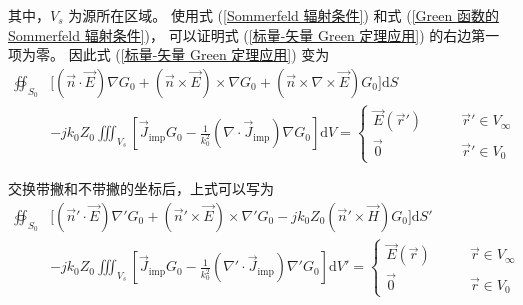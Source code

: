 \par 其中，$V_{s}$ 为源所在区域。
使用式 (\ref{Sommerfeld 辐射条件}) 和式 (\ref{Green 函数的 Sommerfeld 辐射条件})，
可以证明式 (\ref{标量-矢量 Green 定理应用}) 的右边第一项为零。
因此式 (\ref{标量-矢量 Green 定理应用}) 变为
\begin{equation}
    \begin{aligned}
        \oiint_{S_0} &\Big[
            (\vec{n}\cdot \vec{E})\nabla G_0
            +(\vec{n}\times \vec{E})\times\nabla G_0
            +(\vec{n}\times\nabla\times \vec{E})G_0
        \Big]\text{d}S\\
        &-jk_0Z_0\iiint_{V_{s}} \left[
            \vec{J}_{\text{imp}} G_0
            -\frac{1}{k_0^2}(\nabla \cdot \vec{J}_{\text{imp}})
            \nabla G_0
        \right]\text{d}V
        =\left\{
            \begin{aligned}
                \vec{E}(\vec{r}') \qquad &\vec{r}' \in V_{\infty} \\
                \vec{0} \ \ \ \qquad &\vec{r}' \in V_{0}
            \end{aligned}
        \right.
    \end{aligned}
    \label{三维积分方程}
\end{equation}
\par 交换带撇和不带撇的坐标后，上式可以写为
\begin{equation}
    \begin{aligned}
        \oiint_{S_0} &\Big[
            (\vec{n}'\cdot \vec{E})\nabla' G_0
            +(\vec{n}'\times \vec{E})\times\nabla' G_0
            -jk_0Z_0(\vec{n}'\times\vec{H})G_0
        \Big]\text{d}S'\\
        &-jk_0Z_0\iiint_{V_{s}} \left[
            \vec{J}_{\text{imp}} G_0
            -\frac{1}{k_0^2}(\nabla' \cdot \vec{J}_{\text{imp}})
            \nabla' G_0
        \right]\text{d}V'
        =\left\{
            \begin{aligned}
                \vec{E}(\vec{r}) \qquad &\vec{r} \in V_{\infty} \\
                \vec{0} \ \ \ \qquad &\vec{r} \in V_{0}
            \end{aligned}
        \right.
    \end{aligned}
    \label{三维积分方程变式}
\end{equation}

